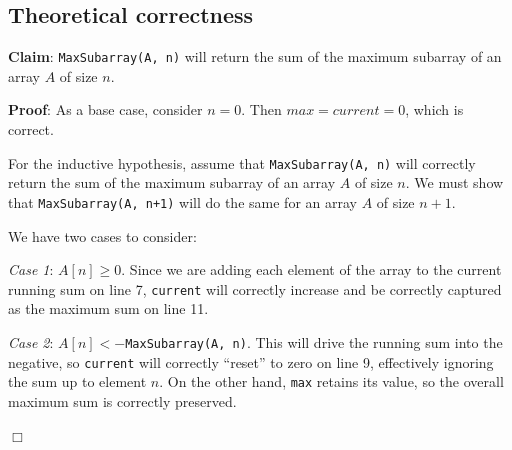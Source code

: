 \documentclass[a4paper,10pt]{article}
\begin{document}
\begin{samepage}
	\section{Theoretical correctness}
		{\bf Claim}: {\tt MaxSubarray(A, n)} will return the sum of the maximum subarray of an array $A$ of size $n$.

		{\bf Proof}: As a base case, consider $n=0$. Then $max = current = 0$, which is correct.

		For the inductive hypothesis, assume that {\tt MaxSubarray(A, n)} will correctly return the sum of the maximum subarray of an array $A$ of size $n$. We must show that {\tt MaxSubarray(A, n+1)} will do the same for an array $A$ of size $n+1$.
		
		We have two cases to consider:

		{\it Case 1}: $A[n] \geq 0$. Since we are adding each element of the array to the current running sum on line 7, {\tt current} will correctly increase and be correctly captured as the maximum sum on line 11.

		{\it Case 2}: $A[n] < -${\tt MaxSubarray(A, n)}. This will drive the running sum into the negative, so {\tt current} will correctly ``reset'' to zero on line 9, effectively ignoring the sum up to element $n$. On the other hand, {\tt max} retains its value, so the overall maximum sum is correctly preserved.

		\begin{center}
		$\Box$
		\end{center}

\end{samepage} 
\end{document}
